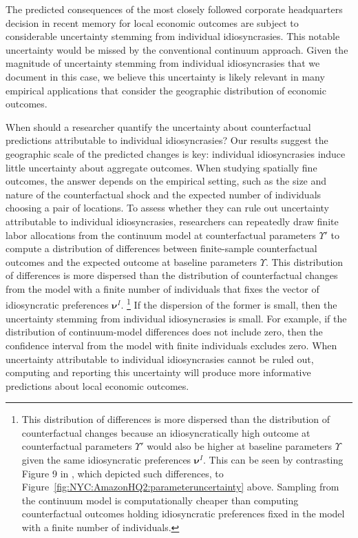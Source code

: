 \documentclass[11pt]{article}
\theoremstyle{definition}
\begin{document}
The predicted consequences of the most closely followed corporate headquarters decision in recent memory
for local economic outcomes are subject to considerable uncertainty stemming from individual idiosyncrasies.
This notable uncertainty would be missed by the conventional continuum approach.
Given the magnitude of uncertainty stemming from individual idiosyncrasies that we document in this case,
we believe this uncertainty is likely relevant in many empirical applications that consider the geographic distribution of economic outcomes.

When should a researcher quantify the uncertainty about counterfactual predictions attributable to individual idiosyncrasies?
Our results suggest the geographic scale of the predicted changes is key:
individual idiosyncrasies induce little uncertainty about aggregate outcomes.
When studying spatially fine outcomes, the answer depends on the empirical setting,
such as the size and nature of the counterfactual shock
and the expected number of individuals choosing a pair of locations.
To assess whether they can rule out uncertainty attributable to individual idiosyncrasies,
researchers can repeatedly draw finite labor allocations from the continuum model at counterfactual parameters $\Upsilon'$
to compute a distribution of differences between finite-sample counterfactual outcomes and the expected outcome at baseline parameters $\Upsilon$.
This distribution of differences is more dispersed than
the distribution of counterfactual changes from the model with a finite number of individuals that fixes the vector of idiosyncratic preferences $\boldsymbol \nu^{I}$.%
\footnote{
	This distribution of differences is more dispersed than the distribution of counterfactual changes
	because 
	an idiosyncratically high outcome at counterfactual parameters $\Upsilon'$
	would also be higher at baseline parameters $\Upsilon$
	given the same idiosyncratic preferences $\boldsymbol \nu^{I}$.
	This can be seen by contrasting Figure 9 in \cite{DingelTintelnot:2021}, which depicted such differences,
	to Figure~\ref{fig:NYC:AmazonHQ2:parameteruncertainty} above.
	Sampling from the continuum model is computationally cheaper than
	computing counterfactual outcomes holding idiosyncratic preferences fixed in the model with a finite number of individuals.
}
If the dispersion of the former is small, then the uncertainty stemming from individual idiosyncrasies is small.
For example, if the distribution of continuum-model differences does not include zero,
then the confidence interval from the model with finite individuals excludes zero.
When uncertainty attributable to individual idiosyncrasies cannot be ruled out,
computing and reporting this uncertainty will produce more informative predictions about local economic outcomes.
\end{document}
